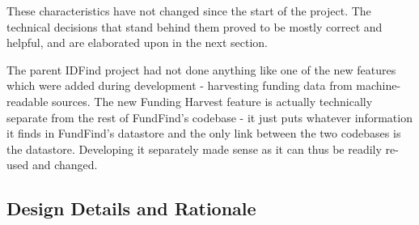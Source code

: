 These characteristics have not changed since the start of the project. The technical decisions that stand behind them proved to be mostly correct and helpful, and are elaborated upon in the next section.

The parent IDFind project had not done anything like one of the new features which were added during development - harvesting funding data from machine-readable sources. The new Funding Harvest feature is actually technically separate from the rest of FundFind's codebase - it just puts whatever information it finds in FundFind's datastore and the only link between the two codebases is the datastore. Developing it separately made sense as it can thus be readily re-used and changed.

\subsection{Design Details and Rationale}
\label{design-rationale}


